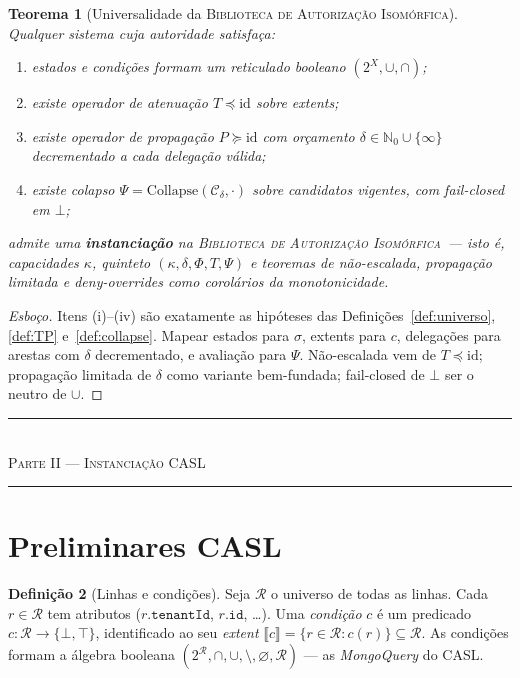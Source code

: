 \documentclass[11pt]{article}
\newcommand{\BAI}{\textsc{Biblioteca de Autorização Isomórfica}}
\newtheorem{theorem}{Teorema}
\theoremstyle{definition}
\newtheorem{definition}[theorem]{Definição}
\newcommand{\R}{\mathcal{R}}
\newcommand{\ext}[1]{\llbracket #1 \rrbracket}
\newcommand{\tenant}{\texttt{tenantId}}
\newcommand{\dep}{\delta}
\newcommand{\NN}{\mathbb{N}_0}
\newcommand{\CalC}{\mathcal{C}}
\newcommand{\Collapse}{\mathrm{Collapse}}
\newcommand{\Phif}{\Phi}
\newcommand{\parttitle}[1]{%
  \clearpage
  \vspace*{0.5em}
  \begin{center}
  {\color{ourovivo}\rule{2.4cm}{0.5pt}}\\[6pt]
  {\fontsize{15}{18}\selectfont\scshape\color{ouro}#1}\\[6pt]
  {\color{prata}\rule{2.4cm}{0.5pt}}
  \end{center}
  \vspace{1.2em}
}
\begin{document}
\begin{theorem}[Universalidade da \BAI]\label{thm:universalidade}
Qualquer sistema cuja autoridade satisfaça:
\begin{enumerate}[nosep,label=(\roman*)]
  \item estados e condições formam um reticulado booleano $(2^X,\cup,\cap)$;
  \item existe operador de atenuação $T\preceq\mathrm{id}$ sobre extents;
  \item existe operador de propagação $P\succeq\mathrm{id}$ com orçamento
        $\dep\in\NN\cup\{\infty\}$ decrementado a cada delegação válida;
  \item existe colapso $\Psi=\Collapse(\CalC_\dep,\cdot)$ sobre candidatos
        vigentes, com fail-closed em $\bot$;
\end{enumerate}
admite uma \textbf{instanciação} na \BAI\ --- isto é, capacidades $\kappa$,
quinteto $(\kappa,\dep,\Phif,T,\Psi)$ e teoremas de não-escalada,
propagação limitada e deny-overrides como corolários da monotonicidade.
\end{theorem}

\begin{proof}[Esboço]
Itens (i)--(iv) são exatamente as hipóteses das Definições~\ref{def:universo},
\ref{def:TP} e~\ref{def:collapse}. Mapear estados para $\sigma$, extents para
$c$, delegações para arestas com $\dep$ decrementado, e avaliação para $\Psi$.
Não-escalada vem de $T\preceq\mathrm{id}$; propagação limitada de $\dep$ como
variante bem-fundada; fail-closed de $\bot$ ser o neutro de $\cup$.
\end{proof}

\parttitle{Parte II --- Instanciação CASL}

\section{Preliminares CASL}

\begin{definition}[Linhas e condições]
Seja $\R$ o universo de todas as linhas. Cada $r\in\R$ tem atributos
($r.\tenant$, $r.\texttt{id}$, \dots). Uma \emph{condição} $c$ é um predicado
$c:\R\to\{\bot,\top\}$, identificado ao seu \emph{extent}
$\ext{c}=\{r\in\R:c(r)\}\subseteq\R$. As condições formam a álgebra booleana
$(2^{\R},\cap,\cup,\setminus,\varnothing,\R)$ --- as \emph{MongoQuery} do CASL.
\end{definition}
\end{document}
